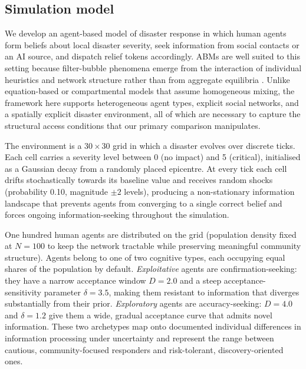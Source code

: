 \documentclass[pdflatex,sn-basic]{sn-jnl}
\begin{document}
\subsection{Simulation model}\label{sec:model}

We develop an agent-based model of disaster response in which human agents form beliefs about local disaster severity, seek information from social contacts or an AI source, and dispatch relief tokens accordingly. ABMs are well suited to this setting because filter-bubble phenomena emerge from the interaction of individual heuristics and network structure rather than from aggregate equilibria \citep{epstein2006generative,axelrod1997complexity}.
Unlike equation-based or compartmental models that assume homogeneous mixing, the framework here supports heterogeneous agent types, explicit social networks, and a spatially explicit disaster environment, all of which are necessary to capture the structural access conditions that our primary comparison manipulates.

The environment is a $30 \times 30$ grid in which a disaster evolves over discrete ticks. Each cell carries a severity level between 0 (no impact) and 5 (critical), initialised as a Gaussian decay from a randomly placed epicentre. At every tick each cell drifts stochastically towards its baseline value and receives random shocks (probability 0.10, magnitude $\pm 2$ levels), producing a non-stationary information landscape that prevents agents from converging to a single correct belief and forces ongoing information-seeking throughout the simulation.

One hundred human agents are distributed on the grid (population density fixed at $N = 100$ to keep the network tractable while preserving meaningful community structure). Agents belong to one of two cognitive types, each occupying equal shares of the population by default. \emph{Exploitative} agents are confirmation-seeking: they have a narrow acceptance window $D = 2.0$ and a steep acceptance-sensitivity parameter $\delta = 3.5$, making them resistant to information that diverges substantially from their prior. \emph{Exploratory} agents are accuracy-seeking: $D = 4.0$ and $\delta = 1.2$ give them a wide, gradual acceptance curve that admits novel information. These two archetypes map onto documented individual differences in information processing under uncertainty \citep{hertwig2016homo,march1991exploration}
and represent the range between cautious, community-focused responders and risk-tolerant, discovery-oriented ones.
\end{document}
